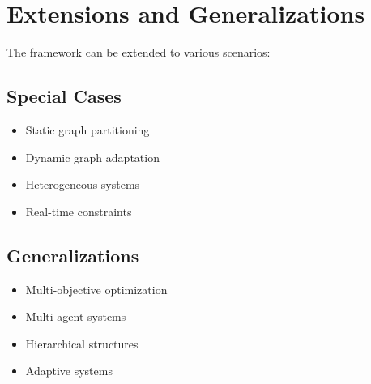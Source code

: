 \section{Extensions and Generalizations}
The framework can be extended to various scenarios:

\subsection{Special Cases}
\begin{itemize}
    \item Static graph partitioning
    \item Dynamic graph adaptation
    \item Heterogeneous systems
    \item Real-time constraints
\end{itemize}

\subsection{Generalizations}
\begin{itemize}
    \item Multi-objective optimization
    \item Multi-agent systems
    \item Hierarchical structures
    \item Adaptive systems
\end{itemize} 